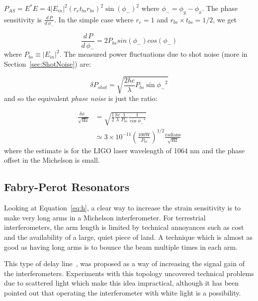 $P_{AS} = E^{*}E = 4 |E_{in}|^2(r_e t_{bs} r_{bs})^2 \sin{(\phi_{-})}^2$
where $\phi_{-} = \phi_y - \phi_x$. 
The phase sensitivity is $\frac{d \, P}{d \, \phi_{-}}$. In the simple case where
$r_e = 1$ and $r_{bs} \times t_{bs} = 1/2$, we get

\begin{equation}
\frac{d \, P}{d \, \phi_{-}} = 2 P_{bs} sin(\phi_-) cos(\phi_-) 
\end{equation}
where $P_{bs} \equiv |E_{in}|^2$. The measured power fluctuations due to 
shot noise (more in Section~\ref{sec:ShotNoise}) are:

\begin{equation}
\delta P_{shot} = \sqrt{\frac{2 h c}{\lambda} P_{bs} \sin{\phi_-}^2}
\end{equation}
and so the equivalent \emph{phase noise} is just the ratio:

\begin{equation}
 \begin{aligned}
  \frac{\delta \phi_-}{\sqrt{\mbox{Hz}}} 
         &= \sqrt{\frac{1}{2} \frac{h c}{\lambda} 
            \frac{1}{P_{bs}} \frac{1}{\cos{\phi_-}^2}} \\
         &\simeq 3 \times 10^{-11} \left(\frac{100 \mbox{W}}{P_{bs}}\right)^{1/2}
            \frac{\mbox{radians}}{\sqrt{\mbox{Hz}}}
 \end{aligned}
\label{eq:PhaseNoise}
\end{equation}
where the estimate is for the LIGO laser wavelength of 1064 nm and the phase
offset in the Michelson is small.


\subsection{Fabry-Perot Resonators}

Looking at Equation~\ref{eq:h}, a clear way to increase the strain sensitivity is 
to make very long arms in a
Michelson interferometer. For terrestrial interferometers, the arm length
is limited by technical annoyances such as cost and the availability of a large,
quiet piece of land. A technique which is almost as good as having long
arms is to bounce the beam multiple times in each arm.

This type of delay line~\cite{Herriot}, was proposed \cite{Rai:QPR} as a way 
of increasing the signal gain of the interferometers. Experiments with
this topology \cite{David:Garching} uncovered technical problems due to
scattered light which make this idea impractical, although it has been
pointed out that operating the interferometer with white light is a possibility.

